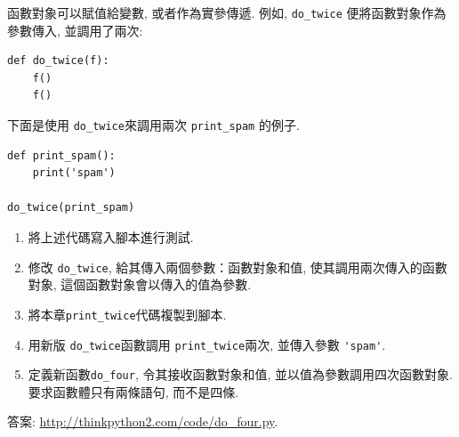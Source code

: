 \documentclass[10pt]{book}
\begin{document}
\begin{exercise}

函數對象可以賦值給變數, 或者作為實參傳遞. 
例如, \verb"do_twice" 便將函數對象作為參數傳入, 並調用了兩次:

\begin{verbatim}
def do_twice(f):
    f()
    f()
\end{verbatim}

下面是使用 \verb"do_twice"來調用兩次 \verb"print_spam" 的例子. 

\begin{verbatim}
def print_spam():
    print('spam')

do_twice(print_spam)
\end{verbatim}

\begin{enumerate}

\item 將上述代碼寫入腳本進行測試.

\item 修改 \verb"do_twice", 給其傳入兩個參數：函數對象和值, 
使其調用兩次傳入的函數對象, 這個函數對象會以傳入的值為參數.

\item 將本章\verb"print_twice"代碼複製到腳本.

\item 用新版 \verb"do_twice"函數調用 \verb"print_twice"兩次, 
並傳入參數 \verb"'spam'".

\item 定義新函數\verb"do_four", 令其接收函數對象和值, 
並以值為參數調用四次函數對象. 
要求函數體只有兩條語句, 而不是四條. 

\end{enumerate}

答案: \url{http://thinkpython2.com/code/do_four.py}.

\end{exercise}
\end{document}
